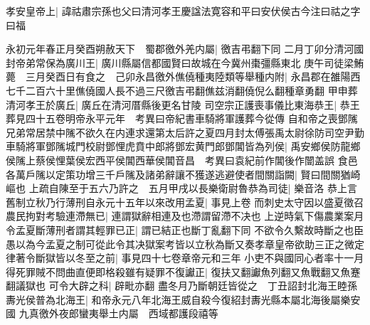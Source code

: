 孝安皇帝上|{
	諱祜肅宗孫也父曰清河孝王慶諡法寛容和平曰安伏侯古今注曰祜之字曰福}


永初元年春正月癸酉朔赦天下　蜀郡徼外羌内屬|{
	徼吉弔翻下同}
二月丁卯分清河國封帝弟常保為廣川王|{
	廣川縣屬信都國賢曰故城在今冀州棗彊縣東北}
庚午司徒梁鮪薨　三月癸酉日有食之　己卯永昌徼外僬僥種夷陸類等舉種内附|{
	永昌郡在雒陽西七千二百六十里僬僥國人長不過三尺徼吉弔翻僬兹消翻僥倪么翻種章勇翻}
甲申葬清河孝王於廣丘|{
	廣丘在清河厝縣後更名甘陵}
司空宗正護喪事儀比東海恭王|{
	恭王葬見四十五卷明帝永平元年　考異曰帝紀書車騎將軍護葬今從傳}
自和帝之喪鄧隲兄弟常居禁中隲不欲久在内連求還第太后許之夏四月封太傅張禹太尉徐防司空尹勤車騎將軍鄧隲城門校尉鄧悝虎賁中郎將鄧宏黄門郎鄧閶皆為列侯|{
	禹安鄉侯防龍鄉侯隲上蔡侯悝葉侯宏西平侯閶西華侯閶音昌　考異曰袁紀前作閶後作闓盖誤}
食邑各萬戶隲以定策功增三千戶隲及諸弟辭讓不獲遂逃避使者間關詣闕|{
	賢曰間關猶崎嶇也}
上疏自陳至于五六乃許之　五月甲戌以長樂衛尉魯恭為司徒|{
	樂音洛}
恭上言舊制立秋乃行薄刑自永元十五年以來改用孟夏|{
	事見上卷}
而刺史太守因以盛夏徵召農民拘對考驗連滯無已|{
	連謂獄辭相連及也滯謂留滯不决也}
上逆時氣下傷農業案月令孟夏斷薄刑者謂其輕罪已正|{
	謂已結正也斷丁亂翻下同}
不欲令久繫故時斷之也臣愚以為今孟夏之制可從此令其决獄案考皆以立秋為斷又奏孝章皇帝欲助三正之微定律著令斷獄皆以冬至之前|{
	事見四十七卷章帝元和三年}
小吏不與國同心者率十一月得死罪賊不問曲直便即格殺雖有疑罪不復讞正|{
	復扶又翻讞魚列翻又魚戰翻又魚蹇翻議獄也}
可令大辟之科|{
	辟毗亦翻}
盡冬月乃斷朝廷皆從之　丁丑詔封北海王睦孫夀光侯普為北海王|{
	和帝永元八年北海王威自殺今復紹封夀光縣本屬北海後屬樂安國}
九真徼外夜郎蠻夷舉土内屬　西域都護段禧等

